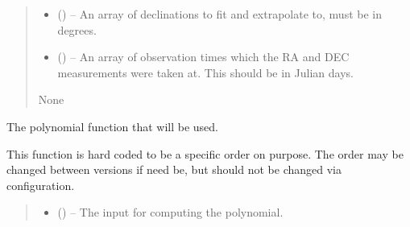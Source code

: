 \documentclass[letterpaper,11pt,english]{sphinxmanual}
\begin{document}
\begin{savenotes}
\begin{fulllineitems}
\begin{savenotes}
\begin{fulllineitems}
\begin{quote}
\begin{description}
\begin{itemize}
\item {} 
\sphinxAtStartPar
{} () – An array of declinations to fit and extrapolate to, must be in
degrees.

\item {} 
\sphinxAtStartPar
{} () – An array of observation times which the RA and DEC measurements
were taken at. This should be in Julian days.

\end{itemize}

\sphinxAtStartPar
None

\end{description}\end{quote}

\end{fulllineitems}\end{savenotes}


\begin{savenotes}\begin{fulllineitems}
\label{\detokenize{code/opihiexarata.propagate.polynomial:opihiexarata.propagate.polynomial.QuadraticPropagationEngine.__quadratic_function}}
\pysigstartsignatures
{}
\pysigstopsignatures
\sphinxAtStartPar
The polynomial function that will be used.

\sphinxAtStartPar
This function is hard coded to be a specific order on purpose. The
order may be changed between versions if need be, but should not be
changed via configuration.
\begin{quote}\begin{description}
\begin{itemize}
\item {} 
\sphinxAtStartPar
{} () – The input for computing the polynomial.


\end{itemize}
\end{description}
\end{quote}
\end{fulllineitems}
\end{savenotes}
\end{fulllineitems}
\end{savenotes}
\end{document}
